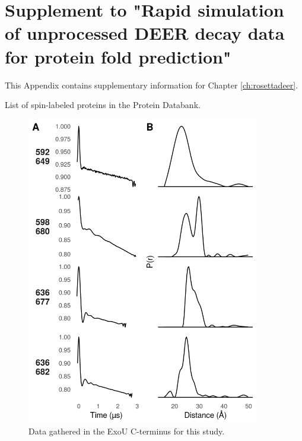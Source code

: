 \clearpage %

\chapter{Supplement to "Rapid simulation of unprocessed DEER decay data for protein fold prediction"} \label{app:rosettadeer_supp}

This Appendix contains supplementary information for Chapter \ref{ch:rosettadeer}.

\begin{table}[h!]
\scriptsize
\renewcommand{\tabcolsep}{0.09cm}
\centering
\caption[List of spin-labeled proteins in the Protein Databank.]{List of spin-labeled proteins in the Protein Databank.}

\label{tab:rosettadeer_main_slproteins}
\end{table}

\begin{figure}[h]
\centering
\includegraphics[width=4in]{Figures/rosettadeer_supp_exou.pdf}
 \caption[Data gathered in the ExoU C-terminus for this study.]{Data gathered in the ExoU C-terminus for this study.}
\label{fig:rosettadeer_supp_exou}
\end{figure}

